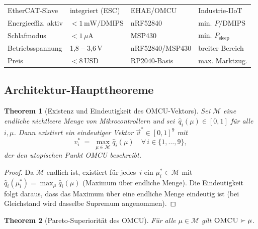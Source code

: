 ﻿\documentclass[12pt, a4paper]{article}
\theoremstyle{plain}
\newtheorem{theorem}{Theorem}[section]
\theoremstyle{definition}
\theoremstyle{remark}
\newcommand{\omcu}{\textsc{OMCU}}
\begin{document}
\begin{table}[H]
\begin{tabular}{llll}
    EtherCAT-Slave         & integriert (ESC)          & EHAE/OMCU        & Industrie-IIoT \\
    Energieeffiz. aktiv & $< 1\,\text{mW/DMIPS}$   & nRF52840         & min. $P/\text{DMIPS}$\\
    Schlafmodus            & $< 1\,\mu\text{A}$        & MSP430           & min. $P_\text{sleep}$\\
    Betriebsspannung       & 1,8 -- 3,6\,V             & nRF52840/MSP430  & breiter Bereich \\
    Preis & $< 8\,\text{USD}$         & RP2040-Basis     & max. Marktzug.\\
    \bottomrule
  \end{tabular}
\end{table}

\subsection{Architektur-Haupttheoreme}

\begin{theorem}[Existenz und Eindeutigkeit des OMCU-Vektors]
\label{thm:omcu_existenz}
  Sei $\mathcal{M}$ eine endliche nichtleere Menge von Mikrocontrollern
  und sei~$\hat{q}_i(\mu) \in [0,1]$ für alle~$i,\mu$.
  Dann existiert ein eindeutiger Vektor
  $\vec{v}^* \in [0,1]^9$ mit
  \[
    v^*_i \;=\; \max_{\mu \in \mathcal{M}} \hat{q}_i(\mu)
    \quad \forall\, i \in \{1,\ldots,9\},
  \]
  der den utopischen Punkt \omcu{} beschreibt.
\end{theorem}

\begin{proof}
  Da $\mathcal{M}$ endlich ist, existiert für jedes~$i$ ein
  $\mu^*_i \in \mathcal{M}$ mit
  $\hat{q}_i(\mu^*_i) = \max_\mu \hat{q}_i(\mu)$
  (Maximum über endliche Menge).
  Die Eindeutigkeit folgt daraus, dass das Maximum über eine endliche Menge
  eindeutig ist (bei Gleichstand wird dasselbe Supremum angenommen).
 
\end{proof}

\begin{theorem}[Pareto-Superiorität des OMCU]
\label{thm:omcu_pareto}
  Für alle $\mu \in \mathcal{M}$ gilt $\omcu{} \succ \mu$.
\end{theorem}
\end{document}
